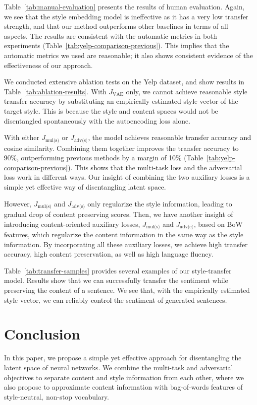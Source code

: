 \documentclass[letterpaper]{article} %
\newcommand{\loss}[1]{J_{\text{#1}}}
\begin{document}
Table~\ref{tab:manual-evaluation} presents the results of human evaluation. Again, we see that the style embedding model \cite{fu2018style} is ineffective as it has a very low transfer strength, and that our method outperforms other baselines in terms of all aspects. The results are consistent with the automatic metrics in both experiments (Table~\ref{tab:yelp-comparison-previous}). This implies that the automatic metrics we used are reasonable; it also shows consistent evidence of the effectiveness of our approach.

We conducted extensive ablation tests on the Yelp dataset, and show results in Table~\ref{tab:ablation-results}. With $\loss{VAE}$ only, we cannot achieve reasonable style transfer accuracy by substituting an empirically estimated style vector of the target style.  This is because the style and content spaces would not be disentangled spontaneously with the autoencoding loss alone.

With either $\loss{mul(s)}$ or $\loss{adv(s)}$, the model achieves reasonable transfer accuracy and cosine similarity. Combining them together improves the transfer accuracy to 90\%, outperforming previous methods by a margin of 10\% (Table~\ref{tab:yelp-comparison-previous}). This shows that the multi-task loss and the adversarial loss work in different ways. Our insight of combining the two auxiliary losses is a simple yet effective way of disentangling latent space.

However, $\loss{mul(s)}$ and $\loss{adv(s)}$ only regularize the style information, leading to gradual drop of content preserving scores. Then, we have another insight of introducing content-oriented auxiliary losses, $\loss{mul(s)}$ and $\loss{adv(c)}$, based on BoW features, which regularize the content information in the same way as the style information. By incorporating all these auxiliary losses, we achieve high transfer accuracy, high content preservation, as well as high language fluency.


Table~\ref{tab:transfer-samples} provides several examples of our style-transfer model. Results show that we can successfully transfer the sentiment while preserving the content of a sentence.
We see that, with the empirically estimated style vector, we can reliably control the sentiment of generated sentences.

\section{Conclusion}
In this paper, we propose a simple yet effective approach for disentangling the latent space of neural networks. We combine the multi-task and adversarial objectives to separate content and style information from each other, where we also propose to approximate content information with bag-of-words features of style-neutral, non-stop vocabulary.
\end{document}
